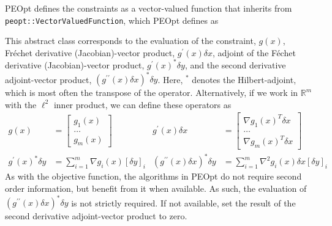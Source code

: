 \documentclass{report}
\newcommand{\re}{\mathbb{R}}
\begin{document}
        PEOpt defines the constraints as a vector-valued function that inherits from \texttt{peopt::VectorValuedFunction}, which PEOpt defines as

This abstract class corresponds to the evaluation of the constraint, $g(x)$, Fr\'{e}chet derivative (Jacobian)-vector product, $g^\prime(x)\delta x$, adjoint of the F\'{e}chet derivative (Jacobian)-vector product, $g^\prime(x)^*\delta y$, and the second derivative adjoint-vector product, $(g^{\prime\prime}(x)\delta x)^*\delta y$.  Here, $^*$ denotes the Hilbert-adjoint, which is most often the transpose of the operator.  Alternatively, if we work in $\re^m$ with the $\ell^2$ inner product, we can define these operators as
\begin{align*}
        g(x)&=\begin{bmatrix}
            g_1(x)\\
            \dots\\
            g_m(x)
        \end{bmatrix}
        & g^\prime(x)\delta x&=\begin{bmatrix}
                \nabla g_1(x)^T \delta x\\
                \dots\\
                \nabla g_m(x)^T \delta x
        \end{bmatrix}\\
        g^\prime(x)^*\delta y&=
        \sum\limits_{i=1}^m \nabla g_i(x) [\delta y]_i 
        & (g^{\prime\prime}(x)\delta x)^*\delta y&=
        \sum\limits_{i=1}^m \nabla^2 g_i(x)\delta x [\delta y]_i 
\end{align*}
As with the objective function, the algorithms in PEOpt do not require second order information, but benefit from it when available.  As such, the evaluation of $(g^{\prime\prime}(x)\delta x)^*\delta y$ is not strictly required.  If not available, set the result of the second derivative adjoint-vector product to zero.
\end{document}
